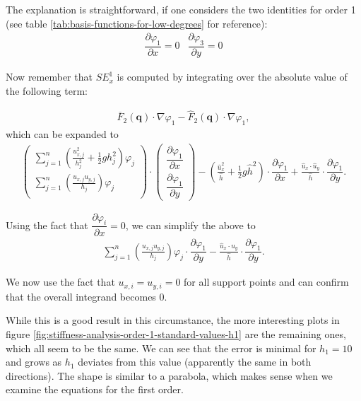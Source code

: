 \documentclass{article}
\newcommand{\pd}[2]{\dfrac{\partial #1}{\partial #2}}
\renewcommand{\phi}{\varphi}
\begin{document}
The explanation is straightforward, if one considers the two identities for order 1 (see table \ref{tab:basis-functions-for-low-degrees} for reference):
\begin{eqnarray*}
  \pd{\phi_1}{x} = 0 & \pd{\phi_3}{y} = 0
\end{eqnarray*}

Now remember that $SE_x^1$ is computed by integrating over the absolute value of the following term:

\begin{align*}
  \overline{F}_2(\mathbf{q}) \cdot \nabla \phi_1 - \widehat{F}_2(\mathbf{q}) \cdot \nabla \phi_1,
\end{align*}
which can be expanded to
\begin{align*}
  \begin{pmatrix}
    \sum_{j=1}^n \left(\frac{u_{x,j}^2}{h_j^2} + \frac{1}{2} g h_j^2\right) \phi_j \\
    \sum_{j=1}^n \left(\frac{u_{x,j} u_{y,j}}{h_j}\right) \phi_j \\
  \end{pmatrix}
  \cdot
  \begin{pmatrix}
    \pd{\phi_1}{x} \\
    \pd{\phi_1}{y}
  \end{pmatrix} -
  \left( \frac{\widehat{u}_x^2}{\widehat{h}} + \frac{1}{2} g \widehat{h}^2 \right) \cdot \pd{\phi_1}{x} +
  \frac{\widehat{u}_x \cdot \widehat{u}_y }{\widehat{h}} \cdot \pd{\phi_1}{y}.
\end{align*}

Using the fact that $\pd{\phi_i}x = 0$, we can simplify the above to
\begin{align*}
    \sum_{j=1}^n \left(\frac{u_{x,j} u_{y,j}}{h_j}\right) \phi_j
    \cdot
    \pd{\phi_1}{y} -
    \frac{\widehat{u}_x \cdot \widehat{u}_y }{\widehat{h}} \cdot \pd{\phi_1}{y}.
\end{align*}

We now use the fact that $u_{x,i}=u_{y,i}=0$ for all support points and can confirm that the overall integrand becomes 0.

While this is a good result in this circumstance, the more interesting plots in figure \ref{fig:stiffness-analysis-order-1-standard-values-h1} are the remaining ones, which all seem to be the same. We can see that the error is minimal for $h_1=10$ and grows as $h_1$ deviates from this value (apparently the same in both directions). The shape is similar to a parabola, which makes sense when we examine the equations for the first order.
\end{document}
